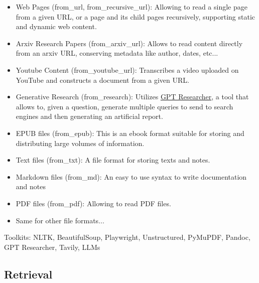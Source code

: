 \begin{itemize}
    \item Web Pages (from\_url, from\_recursive\_url): Allowing to read a single page from a given URL, or a page and its child pages recursively, supporting static and dynamic web content.
    \item Arxiv Research Papers (from\_arxiv\_url): Allows to read content directly from an arxiv URL, conserving metadata like author, dates, etc...
    \item Youtube Content (from\_youtube\_url): Transcribes a video uploaded on YouTube and constructs a document from a given URL.
    \item Generative Research (from\_research): Utilizes \href{https://gptr.dev/}{GPT Researcher}, a tool that allows to, given a question, generate multiple queries to send to search engines and then generating an artificial report.
    \item EPUB files (from\_epub): This is an e\-book format suitable for storing and distributing large volumes of information.
    \item Text files (from\_txt): A file format for storing texts and notes.
    \item Markdown files (from\_md): An easy to use syntax to write documentation and notes
    \item PDF files (from\_pdf): Allowing to read PDF files.
    \item Same for other file formats...
\end{itemize}
Toolkits: NLTK, BeautifulSoup, Playwright, Unstructured, PyMuPDF, Pandoc, GPT Researcher, Tavily, LLMs
\subsection{Retrieval}
